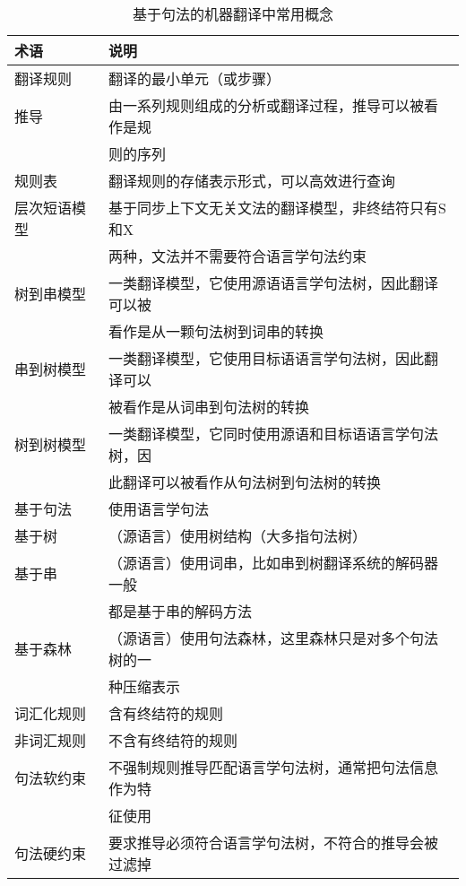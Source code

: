 \begin{table}[hbp]{
\begin{center}
\caption{基于句法的机器翻译中常用概念}
\label{tab:4-2}
{
\begin{tabular}{p{6.5em} | l}
术语 & 说明 \\
\hline
\rule{0pt}{15pt}翻译规则 & 翻译的最小单元（或步骤） \\
\rule{0pt}{15pt}推导 & 由一系列规则组成的分析或翻译过程，推导可以被看作是规\\
&则的序列 \\
\rule{0pt}{15pt}规则表 & 翻译规则的存储表示形式，可以高效进行查询 \\
\rule{0pt}{15pt}层次短语模型 & 基于同步上下文无关文法的翻译模型，非终结符只有S和X\\
&两种，文法并不需要符合语言学句法约束 \\
\rule{0pt}{15pt}树到串模型 & 一类翻译模型，它使用源语语言学句法树，因此翻译可以被\\
&看作是从一颗句法树到词串的转换 \\
\rule{0pt}{15pt}串到树模型 & 一类翻译模型，它使用目标语语言学句法树，因此翻译可以\\
&被看作是从词串到句法树的转换 \\
\rule{0pt}{15pt}树到树模型 & 一类翻译模型，它同时使用源语和目标语语言学句法树，因\\
&此翻译可以被看作从句法树到句法树的转换 \\
\rule{0pt}{15pt}基于句法 & 使用语言学句法 \\
\rule{0pt}{15pt}基于树 &（源语言）使用树结构（大多指句法树） \\
\rule{0pt}{15pt}基于串 &（源语言）使用词串，比如串到树翻译系统的解码器一般\\
&都是基于串的解码方法 \\
\rule{0pt}{15pt}基于森林 &（源语言）使用句法森林，这里森林只是对多个句法树的一\\
&种压缩表示 \\
\rule{0pt}{15pt}词汇化规则 & 含有终结符的规则 \\
\rule{0pt}{15pt}非词汇规则 & 不含有终结符的规则 \\
\rule{0pt}{15pt}句法软约束 & 不强制规则推导匹配语言学句法树，通常把句法信息作为特\\
&征使用 \\
\rule{0pt}{15pt}句法硬约束 & 要求推导必须符合语言学句法树，不符合的推导会被过滤掉 \\
\end{tabular}
}
\end{center}
}\end{table}

